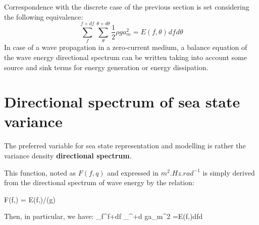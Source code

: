  Correspondence with the discrete case of the previous section is set considering the following equivalence:
\begin{equation} \label{GrindEQ__2_6_}
\sum _{f}^{f+df} \sum _{\theta }^{\theta +d\theta }\frac{1}{2} \rho ga_{m}^{2}  =E(f,\theta )_{}^{} df_{}^{} d\theta
\end{equation}
In case of a wave propagation in a zero-current medium, a balance equation of the wave energy directional spectrum can be written taking into account some source and sink terms for energy generation or energy dissipation.

\section{ Directional spectrum of sea state variance}

 The preferred variable for sea state representation and modelling is rather the variance density \textbf{directional spectrum}.

 This function, noted as $F(f,q)$ and expressed in $m^2.Hz.rad^{-1}$ is simply derived from the directional spectrum of wave energy by the relation:

\bequ
\label{GrindEQ__2_7_}
F(f,\theta) = E(f,\theta)/(\rho g)  
\eequ

Then, in particular, we have: 
\bequ
\label{GrindEQ__2_8_}\sum _{f}^{f+df} \sum _{\theta }^{\theta +d\theta }  \rho ga_{m}^{2} =E(f,\theta )dfd\theta 
\eequ 

